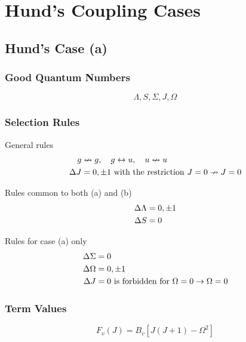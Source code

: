 \chapter{Hund's Coupling Cases}
\label{c:hunds_coupling_cases}

\section{Hund's Case (a)}
\label{s:hunds_case_a}

\subsection{Good Quantum Numbers}

\begin{equation*}
    \Lambda, S, \Sigma, J, \Omega
\end{equation*}

\subsection{Selection Rules}

General rules
\begin{align*}
    g &\nleftrightarrow g, \quad g \leftrightarrow u, \quad u \nleftrightarrow u \\
    \adif{J} &= 0, \pm 1 \text{ with the restriction } J = 0 \nrightarrow J = 0
\end{align*}

Rules common to both (a) and (b)
\begin{align*}
    \adif{\Lambda} &= 0, \pm 1 \\
    \adif{S} &= 0
\end{align*}

Rules for case (a) only
\begin{align*}
    \adif{\Sigma} &= 0 \\
    \adif{\Omega} &= 0, \pm 1 \\
    \adif{J} &= 0 \text{ is forbidden for } \Omega = 0 \rightarrow \Omega = 0
\end{align*}

\subsection{Term Values}

\begin{equation*}
    F_v(J) = B_v[J(J + 1) - \Omega^2]
\end{equation*}

